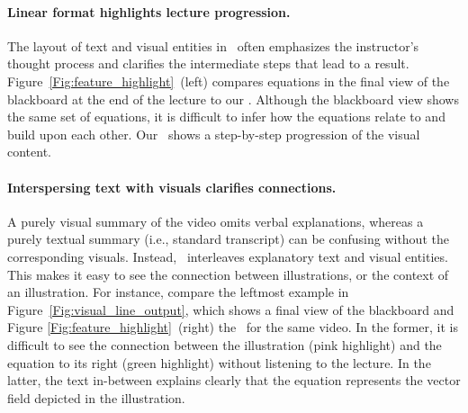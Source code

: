 \paragraph{Linear format highlights lecture progression.} The layout of text and visual entities in \systemname\ often emphasizes the instructor's thought process and clarifies the intermediate steps that lead to a result. Figure~\ref{Fig:feature_highlight}~(left) compares equations in the final view of the blackboard at the end of the lecture to our \systemname . Although the blackboard view shows the same set of equations, it is difficult to infer how the equations relate to and build upon each other. Our \systemname\ shows a step-by-step progression of the visual content. 
%
\paragraph{Interspersing text with visuals clarifies connections.} A purely visual summary of the video omits verbal explanations, whereas a purely textual summary (i.e., standard transcript) can be confusing without the corresponding visuals. Instead, \systemname\ interleaves explanatory text and visual entities. This makes it easy to see the connection between illustrations, or the context of an illustration. For instance, compare the leftmost example in Figure~\ref{Fig:visual_line_output}, which shows a final view of the blackboard and Figure \ref{Fig:feature_highlight}~(right) the \systemname\ for the same video. In the former, it is difficult to see the connection between the illustration (pink highlight) and the equation to its right (green highlight) without listening to the lecture. In the latter, the text in-between explains clearly that the equation represents the vector field depicted in the illustration.
%
